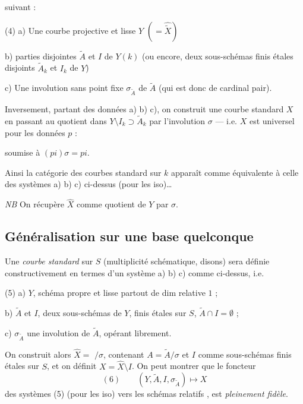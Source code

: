 \documentclass[11pt,a4paper]{article}
\begin{document}

suivant :

(4) a) Une courbe projective et lisse $Y$ $(= \widehat{\widetilde{X}})$ \struck{\ill{}}

b)  parties  disjointes $\widetilde{A}$ et $I$ de $Y(k)$ (ou encore, deux sous-schémas finis étales disjoints $\widetilde{A}_{k}$ et $I_{k}$ de $Y$)

c) Une involution sans point fixe $\sigma_{\widetilde{A}}$ de $\widetilde{A}$ (qui est donc de cardinal pair).

Inversement, partant des données a) b) c), on construit une courbe standard $X$ en passant au quotient dans $Y \setminus I_{k} \supset \widetilde{A}_{k}$ par l'involution $\sigma$ — i.e. $X$ est universel  pour les données $p$ :


soumise à $(pi)\sigma = pi$.

Ainsi la catégorie des courbes standard sur $k$  apparaît comme équivalente à celle des systèmes a) b) c) ci-dessus (pour les iso)…

\emph{NB} On récupère $\widehat{X}$ comme quotient de $Y$ par $\sigma$.

\subsection{Généralisation sur une base quelconque}

Une \emph{courbe standard} sur $S$ (multiplicité schématique, disons) sera définie constructivement en termes d'un système a) b) c) comme ci-dessus, i.e.

(5) a) $Y$, schéma propre et lisse  partout de dim relative $1$ ;

b) $\widetilde{A}$ et $I$, deux sous-schémas de $Y$, finis étales sur $S$, \struck{\ill{}} $\widetilde{A} \cap I = \emptyset$ ;

c) $\sigma_{\widetilde{A}}$ une involution de $\widetilde{A}$, opérant librement.

On construit alors $\widehat{X} =$  $/\sigma$, contenant $A = \widetilde{A}/\sigma$ et $I$ comme sous-schémas  finis étales sur $S$, et on définit $X = \widehat{X} \setminus I$. On peut montrer que le foncteur
\[
(6)\qquad (Y, \widetilde{A}, I, \sigma_{\widetilde{A}}) \longmapsto X
\]
des systèmes (5) (pour les iso) vers les schémas relatifs , est \emph{pleinement fidèle}.
\end{document}
